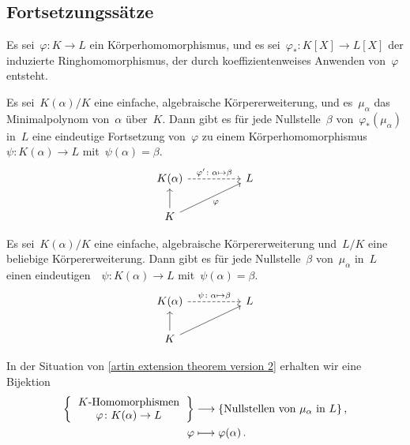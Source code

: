 \subsection{Fortsetzungssätze}

\begin{theorem}
  Es sei~$\varphi \colon K \to L$ ein Körperhomomorphismus, und es sei~$\varphi_* \colon K[X] \to L[X]$ der induzierte Ringhomomorphismus, der durch koeffizientenweises Anwenden von~$\varphi$ entsteht.

  Es sei~$K(\alpha)/K$ eine einfache, algebraische Körpererweiterung, und es~$\mu_\alpha$ das Minimalpolynom von~$\alpha$ über~$K$.
  Dann gibt es für jede Nullstelle~$\beta$ von~$\varphi_*(\mu_\alpha)$ in~$L$ eine eindeutige Fortsetzung von~$\varphi$ zu einem Körperhomomorphismus~$\psi \colon K(\alpha) \to L$ mit~$\psi(\alpha) = \beta$.
  \[
    \begin{tikzcd}[column sep = huge]
      K(\alpha)
      \arrow[dashed]{r}[above]{\varphi' \colon \alpha \mapsto \beta}
      &
      L
      \\
      K
      \arrow{u}
      \arrow{ur}[below right]{\varphi}
      &
      {}
    \end{tikzcd}
  \]
\end{theorem}

\begin{corollary}
  \label{artin extension theorem version 2}
  Es sei~$K(\alpha)/K$ eine einfache, algebraische Körpererweiterung und~$L/K$ eine beliebige Körpererweiterung.
  Dann gibt es für jede Nullstelle~$\beta$ von~$\mu_\alpha$ in~$L$ einen eindeutigen~~$\psi \colon K(\alpha) \to L$ mit~$\psi(\alpha) = \beta$.
  \[
    \begin{tikzcd}[column sep = huge]
      K(\alpha)
      \arrow[dashed]{r}[above]{\psi \colon \alpha \mapsto \beta}
      &
      L
      \\
      K
      \arrow{u}
      \arrow{ur}
      &
      {}
    \end{tikzcd}
  \]
\end{corollary}

\begin{corollary}
  \label{galois existence}
  In der Situation von \cref{artin extension theorem version 2} erhalten wir eine Bijektion
  \begin{align*}
    \left\{
      \begin{tabular}{c}
        \Homomorphismen{$K$}\\
        $\varphi \colon K(\alpha) \to L$
      \end{tabular}
    \right\}
    &\to
    \{
      \text{Nullstellen von~$\mu_\alpha$ in~$L$}
    \} \,,
    \\
    \varphi
    &\mapsto
    \varphi(\alpha) \,.
  \end{align*}
\end{corollary}

